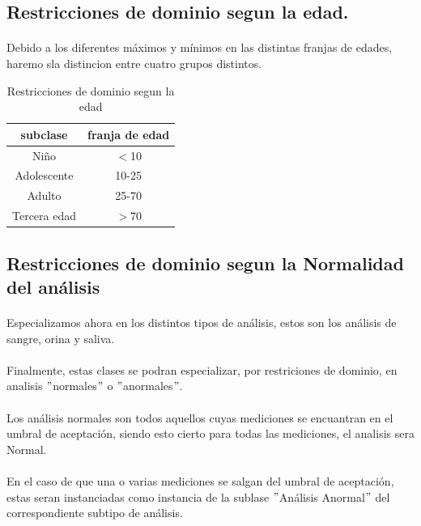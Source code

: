 \documentclass[a4paper,10pt]{article}
\begin{document}
\subsection{Restricciones de dominio segun la edad.}
\paragraph{}
Debido a los diferentes máximos y mínimos en las distintas franjas de edades, haremo sla distincion entre cuatro grupos distintos.
\begin{table}[hbt]
		\begin{center}
		\begin{tabular}{|c|c|}\hline
			subclase & franja de edad \\ \hline
			Niño & $<$10 \\ \hline
			Adolescente & 10-25 \\ \hline
			Adulto & 25-70 \\ \hline
			Tercera edad & $>$70 \\ \hline
		\end{tabular}
		\caption{Restricciones de dominio segun la edad}
	\end{center}
\end{table}
\pagebreak
\subsection{Restricciones de dominio segun la Normalidad del análisis}
\paragraph{}
Especializamos ahora en los distintos tipos de análisis, estos son los análisis de sangre, orina y saliva.
\paragraph{}
Finalmente, estas clases se podran especializar, por restriciones de dominio, en analisis $"$normales$"$ o $"$anormales$"$.
\paragraph{}
Los análisis normales son todos aquellos cuyas mediciones se encuantran en el umbral de aceptación, siendo esto cierto para todas las mediciones, el analisis sera Normal.
\paragraph{}
En el caso de que una o varias mediciones se salgan del umbral de aceptación, estas seran instanciadas como instancia de la sublase $"$Análisis Anormal$"$ del correspondiente subtipo de análisis.
\end{document}

